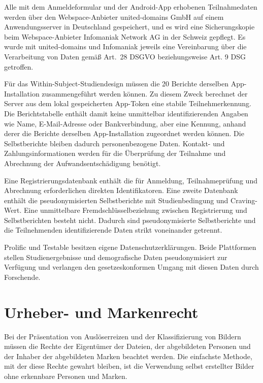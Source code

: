 Alle mit dem Anmeldeformular und der Android-App erhobenen Teilnahmedaten werden über den Webspace-Anbieter united-domains GmbH auf einem Anwendungsserver in Deutschland gespeichert, und es wird eine Sicherungskopie beim Webspace-Anbieter Infomaniak Network AG in der Schweiz gepflegt. Es wurde mit united-domains und Infomaniak jeweils eine Vereinbarung über die Verarbeitung von Daten gemäß Art.~28 DSGVO beziehungsweise Art. 9 DSG getroffen. 

Für das Within-Subject-Studiendesign müssen die 20 Berichte derselben App-Installation zusammengeführt werden können. Zu diesem Zweck berechnet der Server aus dem lokal gespeicherten App-Token eine stabile Teilnehmerkennung. Die Berichtstabelle enthält damit keine unmittelbar identifizierenden Angaben wie Name, E-Mail-Adresse oder Bankverbindung, aber eine Kennung, anhand derer die Berichte derselben App-Installation zugeordnet werden können. Die Selbstberichte bleiben dadurch personenbezogene Daten. Kontakt- und Zahlungsinformationen werden für die Überprüfung der Teilnahme und Abrechnung der Auf\-wandsentschädigung benötigt. 

Eine Registrierungsdatenbank enthält die für Anmeldung, Teilnahmeprüfung und Abrechnung erforderlichen direkten Identifikatoren. Eine zweite Datenbank enthält die pseudonymisierten Selbstberichte mit Studienbedingung und Craving-Wert. Eine unmittelbare Fremdschlüsselbeziehung zwischen Registrierung und Selbstberichten besteht nicht. Dadurch sind pseudonymisierte Selbstberichte und die Teilnehmenden identifizierende Daten strikt voneinander getrennt.

Prolific und Testable besitzen eigene Datenschutzerklärungen. Beide Plattformen stellen Studien\-ergebnisse und demografische Daten pseudonymisiert zur Verfügung und verlangen den gesetzeskonformen Umgang mit diesen Daten durch Forschende. \\
\cite{prolific_researcher_terms, testable_processing_data}

\section{Urheber- und Markenrecht}
Bei der Präsentation von Auslöserreizen und der Klassifizierung von Bildern müssen die Rechte der Eigentümer der Dateien, der abgebildeten Personen und der Inhaber der abgebildeten Marken beachtet werden. Die einfachste Methode, mit der diese Rechte gewahrt bleiben, ist die Verwendung selbst erstellter Bilder ohne erkennbare Personen und Marken.

